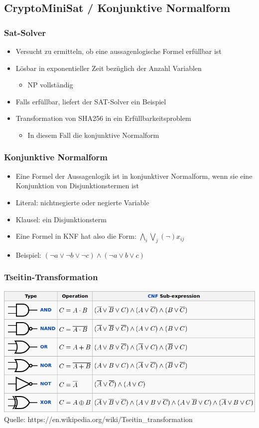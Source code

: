 \documentclass{beamer}
\begin{document}
  \subsection{CryptoMiniSat / Konjunktive Normalform}
    \begin{frame}
      \frametitle{Sat-Solver}
      \begin{itemize}
        \setlength{\itemsep}{20pt}
        \item Versucht zu ermitteln, ob eine aussagenlogische Formel erfüllbar ist
        \item Lösbar in exponentieller Zeit bezüglich der Anzahl Variablen
        \begin{itemize}
          \item NP vollständig
        \end{itemize}
        \item Falls erfüllbar, liefert der SAT-Solver ein Beispiel
        \item Transformation von SHA256 in ein Erfüllbarkeitsproblem
        \begin{itemize}
         \item In diesem Fall die konjunktive Normalform
        \end{itemize}
      \end{itemize}
    \end{frame}
    \begin{frame}
      \frametitle{Konjunktive Normalform}
      \begin{itemize}
        \setlength{\itemsep}{16pt}
        \item Eine Formel der Aussagenlogik ist in konjunktiver Normalform, wenn sie eine Konjunktion von Disjunktionstermen ist
        \item Literal: nichtnegierte oder negierte Variable
        \item Klausel: ein Disjunktionsterm
        \item Eine Formel in KNF hat also die Form: \newline \newline $ \bigwedge\limits_{i} \bigvee\limits_{j} (\neg)x_{ij} $
        \item Beispiel: $ (\neg a \vee \neg b \vee \neg c) \wedge (\neg a \vee b \vee c) $
      \end{itemize}
    \end{frame}
    \begin{frame}
      \frametitle{Tseitin-Transformation}
      \includegraphics[scale=1]{tseitin.png}\\
      Quelle: https://en.wikipedia.org/wiki/Tseitin\_transformation
    \end{frame}
\end{document}
